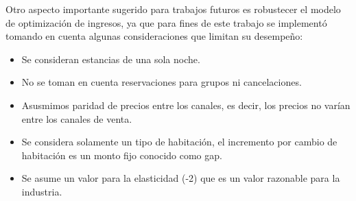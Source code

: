 Otro aspecto importante sugerido para trabajos futuros es robustecer el modelo de optimización de ingresos, ya que para fines de este trabajo se implementó tomando en cuenta algunas consideraciones que limitan su desempeño: 
\begin{itemize}[noitemsep]
  \item Se consideran estancias de una sola noche.
  \item No se toman en cuenta reservaciones para grupos ni cancelaciones.
  \item Asusmimos paridad de precios entre los canales, es decir, los precios no varían entre los canales de venta.
  \item Se considera solamente un tipo de habitación, el incremento por cambio de habitación es un monto fijo conocido como gap.
  \item Se asume un valor para la elasticidad (-2) que es un valor razonable para la industria.
\end{itemize}




